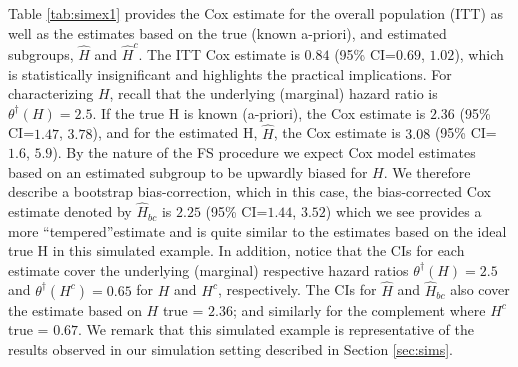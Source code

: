 \documentclass[oupdraft]{bio}
\def\hplim{\theta^{\dagger}(H)}
\def\hcplim{\theta^{\dagger}(H^{c})}
\begin{document}
Table \ref{tab:simex1} provides the Cox estimate for the overall population (ITT) as well as the estimates based on the true (known a-priori), and estimated subgroups, $\hat{H}$ and $\hat{H}^{c}$.  The ITT Cox estimate is $0.84$ (95\% CI=$0.69$, $1.02$), 
which is statistically insignificant and highlights the practical implications.  For characterizing $H$, recall that the underlying (marginal) hazard ratio is $\hplim =2.5$.  If the true H is known (a-priori), the Cox estimate is $2.36$ (95\% CI=$1.47$, $3.78$), and for the estimated H, $\hat{H}$, the Cox estimate is $3.08$ (95\% CI=$1.6$, 
$5.9$).  By the nature of the FS procedure we expect Cox model estimates based on an estimated subgroup to be upwardly biased for $H$.  We therefore describe a bootstrap bias-correction, which in this case, the bias-corrected Cox estimate denoted by $\hat{H}_{bc}$ is $2.25$ (95\% CI=$1.44$, $3.52$) which we see provides a more ``tempered''estimate and is quite similar to the estimates based on the ideal true H in this simulated example.  
In addition, notice that the CIs for each estimate cover the underlying (marginal) respective hazard ratios 
$\hplim =2.5$ and $\hcplim =0.65$ for $H$ and $H^{c}$, respectively.  
The CIs for $\hat{H}$ and $\hat{H}_{bc}$ also cover the estimate based on $H$ true =  $2.36$; and similarly for the complement where $H^{c}$ true =  $0.67$.  We remark that this simulated example is representative of the results observed in our simulation setting described in Section \ref{sec:sims}.





\end{document}
